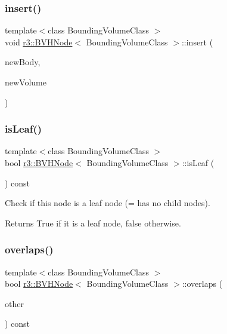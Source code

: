 \subsubsection{\texorpdfstring{insert()}{insert()}}
{\footnotesize\ttfamily template$<$class Bounding\+Volume\+Class $>$ \\
void \mbox{\hyperlink{classr3_1_1_b_v_h_node}{r3\+::\+B\+V\+H\+Node}}$<$ Bounding\+Volume\+Class $>$\+::insert (\begin{DoxyParamCaption}\item[{\mbox{\hyperlink{classr3_1_1_rigid_body}{Rigid\+Body}} $\ast$}]{new\+Body,  }\item[{const Bounding\+Volume\+Class \&}]{new\+Volume }\end{DoxyParamCaption})\hspace{0.3cm}{\ttfamily [protected]}}

\mbox{\label{classr3_1_1_b_v_h_node_a517b40f1a91cda371b3cb786f1c7e155}} 
\subsubsection{\texorpdfstring{is\+Leaf()}{isLeaf()}}
{\footnotesize\ttfamily template$<$class Bounding\+Volume\+Class $>$ \\
bool \mbox{\hyperlink{classr3_1_1_b_v_h_node}{r3\+::\+B\+V\+H\+Node}}$<$ Bounding\+Volume\+Class $>$\+::is\+Leaf (\begin{DoxyParamCaption}{ }\end{DoxyParamCaption}) const}



Check if this node is a leaf node (= has no child nodes). 

\begin{DoxyReturn}{Returns}
True if it is a leaf node, false otherwise. 
\end{DoxyReturn}
\mbox{\label{classr3_1_1_b_v_h_node_a69ec6f958bbe07629cd979599532dfd8}} 
\subsubsection{\texorpdfstring{overlaps()}{overlaps()}}
{\footnotesize\ttfamily template$<$class Bounding\+Volume\+Class $>$ \\
bool \mbox{\hyperlink{classr3_1_1_b_v_h_node}{r3\+::\+B\+V\+H\+Node}}$<$ Bounding\+Volume\+Class $>$\+::overlaps (\begin{DoxyParamCaption}\item[{\mbox{\hyperlink{classr3_1_1_b_v_h_node}{B\+V\+H\+Node}}$<$ Bounding\+Volume\+Class $>$ $\ast$}]{other }\end{DoxyParamCaption}) const\hspace{0.3cm}{\ttfamily [protected]}}

